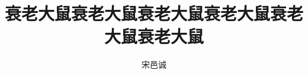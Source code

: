 \documentclass[a4paper, 12pt, smd]{HBUThesis}
\title{衰老大鼠衰老大鼠衰老大鼠衰老大鼠衰老大鼠衰老大鼠}
\author{宋邑诚}
\begin{document}
\makecover
\end{document}

